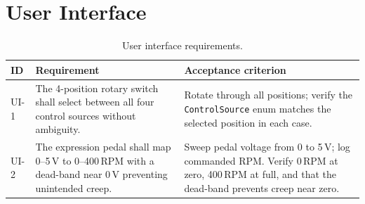 \section{User Interface}

\begin{table}[H]
	\centering
	\begin{tabular}{p{1.2cm} p{5.5cm} p{6cm}}
		\toprule
		\textbf{ID} & \textbf{Requirement}                                                                                          & \textbf{Acceptance criterion} \\
		\midrule
		UI-1        & The 4-position rotary switch shall select between all four control sources without ambiguity.                 &
		Rotate through all positions; verify the \texttt{ControlSource} enum matches the selected position in each case.                                            \\[4pt]
		UI-2        & The expression pedal shall map 0--5\,V to 0--400\,RPM with a dead-band near 0\,V preventing unintended creep. &
		Sweep pedal voltage from 0 to 5\,V; log commanded RPM. Verify 0\,RPM at zero, 400\,RPM at full, and that the dead-band prevents creep near zero.            \\
		\bottomrule
	\end{tabular}
	\caption{User interface requirements.}
	\label{tab:spec-ui}
\end{table}

\cleardoublepage
